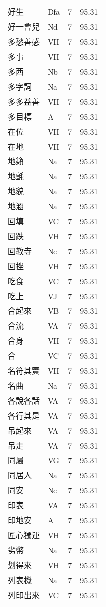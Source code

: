 \documentclass[twocolumn]{book}
\begin{document}
\begin{supertabular}{llrr}
好生 & Dfa & 7 &  95.31\\
好一會兒 & Nd & 7 &  95.31\\
多愁善感 & VH & 7 &  95.31\\
多事 & VH & 7 &  95.31\\
多西 & Nb & 7 &  95.31\\
多字詞 & Na & 7 &  95.31\\
多多益善 & VH & 7 &  95.31\\
多目標 & A & 7 &  95.31\\
在位 & VH & 7 &  95.31\\
在地 & VH & 7 &  95.31\\
地籟 & Na & 7 &  95.31\\
地氈 & Na & 7 &  95.31\\
地貌 & Na & 7 &  95.31\\
地涵 & Na & 7 &  95.31\\
回填 & VC & 7 &  95.31\\
回跌 & VH & 7 &  95.31\\
回教寺 & Nc & 7 &  95.31\\
回挫 & VH & 7 &  95.31\\
吃食 & VC & 7 &  95.31\\
吃上 & VJ & 7 &  95.31\\
合起來 & VB & 7 &  95.31\\
合流 & VA & 7 &  95.31\\
合身 & VH & 7 &  95.31\\
合 & VC & 7 &  95.31\\
名符其實 & VH & 7 &  95.31\\
名曲 & Na & 7 &  95.31\\
各說各話 & VA & 7 &  95.31\\
各行其是 & VA & 7 &  95.31\\
吊起來 & VA & 7 &  95.31\\
吊走 & VA & 7 &  95.31\\
同屬 & VG & 7 &  95.31\\
同居人 & Na & 7 &  95.31\\
同安 & Nc & 7 &  95.31\\
印表 & VA & 7 &  95.31\\
印地安 & A & 7 &  95.31\\
匠心獨運 & VH & 7 &  95.31\\
劣幣 & Na & 7 &  95.31\\
划得來 & VH & 7 &  95.31\\
列表機 & Na & 7 &  95.31\\
列印出來 & VC & 7 &  95.31\\

\end{supertabular}
\end{document}
